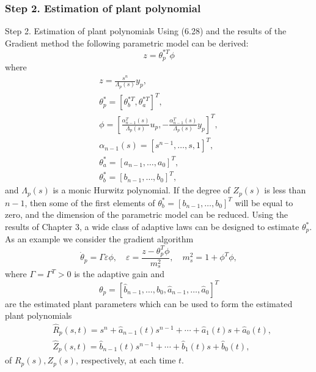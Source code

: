 \documentclass[10pt]{article}
\begin{document}
\begin{multicols*}{2}
\subsubsection{Step 2. Estimation of plant polynomial}
Step 2. Estimation of plant polynomials
Using (6.28) and the results of the Gradient method the following parametric model can be derived:
\begin{equation}
	z=\theta_p^{* T} \phi
\end{equation}
where
\begin{equation}
	\begin{gathered}
		z=\frac{s^n}{\Lambda_p(s)} y_p, \\
		\theta_p^*=\left[\theta_b^{* T}, \theta_a^{* T}\right]^T, \\
		\phi=\left[\frac{\alpha_{n-1}^T(s)}{\Lambda_p(s)} u_p,-\frac{\alpha_{n-1}^T(s)}{\Lambda_p(s)} y_p\right]^T, \\
		\alpha_{n-1}(s)=\left[s^{n-1}, \ldots, s, 1\right]^T, \\
		\theta_a^*=\left[a_{n-1}, \ldots, a_0\right]^T, \\
		\theta_b^*=\left[b_{n-1}, \ldots, b_0\right]^T,
	\end{gathered}
\end{equation}
and $\Lambda_p(s)$ is a monic Hurwitz polynomial. If the degree of $Z_p(s)$ is less than $n-1$, then some of the first elements of $\theta_b^*=\left[b_{n-1}, \ldots, b_0\right]^T$ will be equal to zero, and the dimension of the parametric model can be reduced. Using the results of Chapter 3, a wide class of adaptive laws can be designed to estimate $\theta_p^*$. As an example we consider the gradient algorithm
\begin{equation}
	\dot{\theta}_p=\Gamma \varepsilon \phi, \quad \varepsilon=\frac{z-\theta_p^T \phi}{m_s^2}, \quad m_s^2=1+\phi^T \phi,
\end{equation}
where $\Gamma=\Gamma^T>0$ is the adaptive gain and
\begin{equation}
	\theta_p=\left[\hat{b}_{n-1}, \ldots, \hat{b}_0, \hat{a}_{n-1}, \ldots, \hat{a}_0\right]^T
\end{equation}
are the estimated plant parameters which can be used to form the estimated plant polynomials
\begin{equation}
	\begin{aligned}
		 & \hat{R}_p(s, t)=s^n+\hat{a}_{n-1}(t) s^{n-1}+\cdots+\hat{a}_1(t) s+\hat{a}_0(t), \\
		 & \hat{Z}_p(s, t)=\hat{b}_{n-1}(t) s^{n-1}+\cdots+\hat{b}_1(t) s+\hat{b}_0(t),
	\end{aligned}
\end{equation}
of $R_p(s), Z_p(s)$, respectively, at each time $t$.

\end{multicols*}
\end{document}
